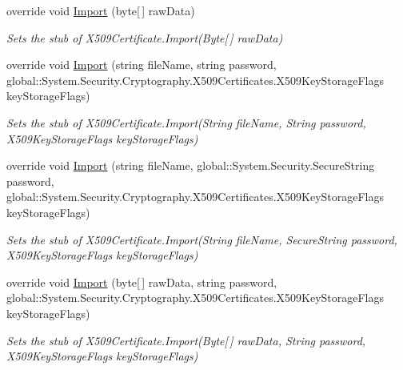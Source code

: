 \begin{DoxyCompactItemize}
override void \hyperlink{class_system_1_1_security_1_1_cryptography_1_1_x509_certificates_1_1_fakes_1_1_stub_x509_certificate_acc1f750051fc03a62af111240ddf9c63}{Import} (byte\mbox{[}$\,$\mbox{]} raw\-Data)
\begin{DoxyCompactList}\small\item\em Sets the stub of X509\-Certificate.\-Import(\-Byte\mbox{[}$\,$\mbox{]} raw\-Data)\end{DoxyCompactList}\item 
override void \hyperlink{class_system_1_1_security_1_1_cryptography_1_1_x509_certificates_1_1_fakes_1_1_stub_x509_certificate_a75a2ff295525f76313f5c800c0899bf8}{Import} (string file\-Name, string password, global\-::\-System.\-Security.\-Cryptography.\-X509\-Certificates.\-X509\-Key\-Storage\-Flags key\-Storage\-Flags)
\begin{DoxyCompactList}\small\item\em Sets the stub of X509\-Certificate.\-Import(\-String file\-Name, String password, X509\-Key\-Storage\-Flags key\-Storage\-Flags)\end{DoxyCompactList}\item 
override void \hyperlink{class_system_1_1_security_1_1_cryptography_1_1_x509_certificates_1_1_fakes_1_1_stub_x509_certificate_a195aed007fda8b0dfb7bbd660012418f}{Import} (string file\-Name, global\-::\-System.\-Security.\-Secure\-String password, global\-::\-System.\-Security.\-Cryptography.\-X509\-Certificates.\-X509\-Key\-Storage\-Flags key\-Storage\-Flags)
\begin{DoxyCompactList}\small\item\em Sets the stub of X509\-Certificate.\-Import(\-String file\-Name, Secure\-String password, X509\-Key\-Storage\-Flags key\-Storage\-Flags)\end{DoxyCompactList}\item 
override void \hyperlink{class_system_1_1_security_1_1_cryptography_1_1_x509_certificates_1_1_fakes_1_1_stub_x509_certificate_af5a26d132a9b9e9044881069561219f5}{Import} (byte\mbox{[}$\,$\mbox{]} raw\-Data, string password, global\-::\-System.\-Security.\-Cryptography.\-X509\-Certificates.\-X509\-Key\-Storage\-Flags key\-Storage\-Flags)
\begin{DoxyCompactList}\small\item\em Sets the stub of X509\-Certificate.\-Import(\-Byte\mbox{[}$\,$\mbox{]} raw\-Data, String password, X509\-Key\-Storage\-Flags key\-Storage\-Flags)\end{DoxyCompactList}\item 

\end{DoxyCompactItemize}
